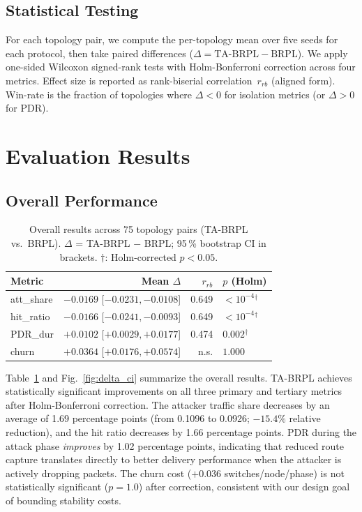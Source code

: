 \documentclass[conference]{IEEEtran}
\begin{document}
\subsection{Statistical Testing}

For each topology pair, we compute the per-topology mean over five seeds
for each protocol, then take paired differences ($\Delta = \text{TA-BRPL} - \text{BRPL}$).
We apply one-sided Wilcoxon signed-rank tests with Holm-Bonferroni correction
across four metrics.
Effect size is reported as rank-biserial correlation~$r_{rb}$ (aligned form).
Win-rate is the fraction of topologies where $\Delta < 0$ for isolation metrics
(or $\Delta > 0$ for PDR).

\section{Evaluation Results}
\label{sec:results}

\subsection{Overall Performance}
\label{sec:results_overall}

\begin{table}[t]
\centering
\caption{Overall results across 75 topology pairs (TA-BRPL vs.\ BRPL).
  $\Delta$ = TA-BRPL $-$ BRPL; 95\,\% bootstrap CI in brackets.
  $\dagger$: Holm-corrected $p < 0.05$.}
\label{tab:main_overall}
\begin{tabular}{lrrl}
\toprule
Metric & Mean $\Delta$ & $r_{rb}$ & $p$ (Holm) \\
\midrule
att\_share & $-0.0169$ [$-0.0231, -0.0108$] & 0.649 & $<10^{-4}$$^\dagger$ \\
hit\_ratio & $-0.0166$ [$-0.0241, -0.0093$] & 0.649 & $<10^{-4}$$^\dagger$ \\
PDR\_dur   & $+0.0102$ [$+0.0029, +0.0177$] & 0.474 & $0.002$$^\dagger$ \\
churn      & $+0.0364$ [$+0.0176, +0.0574$] & n.s.  & $1.000$ \\
\bottomrule
\end{tabular}
\end{table}

Table~\ref{tab:main_overall} and Fig.~\ref{fig:delta_ci}
summarize the overall results.
TA-BRPL achieves statistically significant improvements on all three
primary and tertiary metrics after Holm-Bonferroni correction.
The attacker traffic share decreases by an average of 1.69 percentage points
(from 0.1096 to 0.0926; $-15.4\%$ relative reduction),
and the hit ratio decreases by 1.66 percentage points.
PDR during the attack phase \emph{improves} by 1.02 percentage points,
indicating that reduced route capture translates directly to better
delivery performance when the attacker is actively dropping packets.
The churn cost ($+0.036$ switches/node/phase) is not statistically
significant ($p = 1.0$) after correction,
consistent with our design goal of bounding stability costs.
\end{document}
